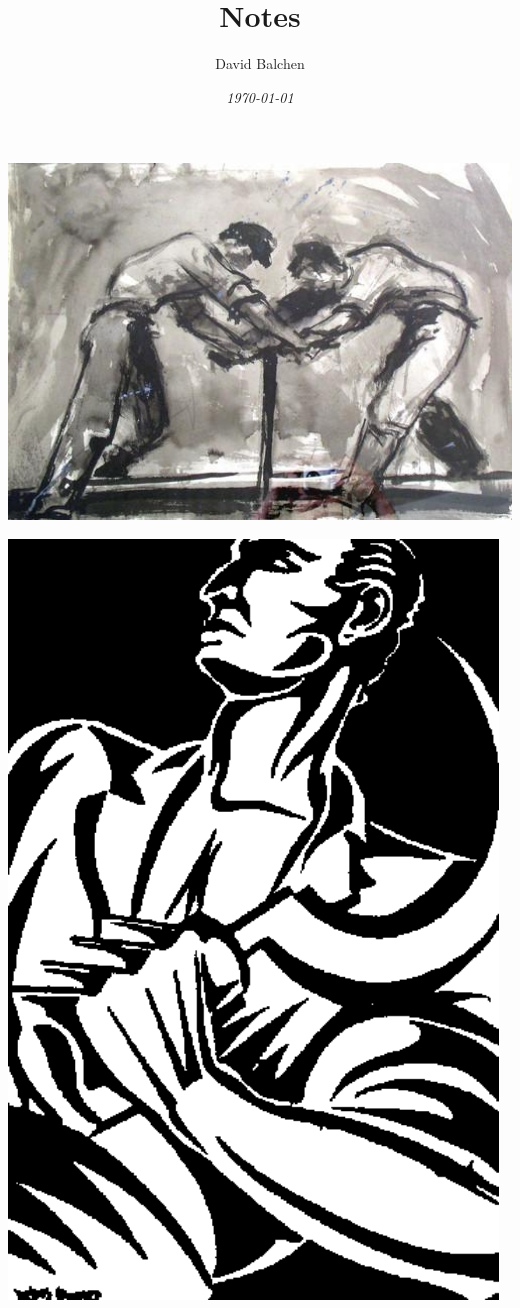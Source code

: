 \documentclass[12pt,twoside]{article}
\author{David Balchen}
\date{\textit{\today}}
\title{{\Huge \textbf{Notes}}}
\begin{document}
\maketitle
{}
\begin{center}
	\includegraphics[width=16cm]{Pictures/Andrejevi1.jpg}
\end{center}
\newpage 
\begin{center}
	\includegraphics[width=13cm]{Pictures/postal5.png}
\end{center}
\end{document}
